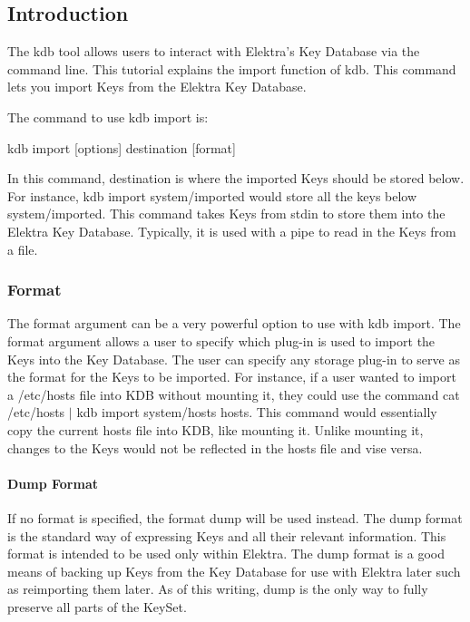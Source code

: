 \subsection*{Introduction}

The kdb tool allows users to interact with Elektra's Key Database via the command line. This tutorial explains the import function of kdb. This command lets you import Keys from the Elektra Key Database.

The command to use kdb import is\+: \begin{DoxyVerb}kdb import [options] destination [format]
\end{DoxyVerb}


In this command, destination is where the imported Keys should be stored below. For instance, {\ttfamily kdb import system/imported} would store all the keys below system/imported. This command takes Keys from stdin to store them into the Elektra Key Database. Typically, it is used with a pipe to read in the Keys from a file.

\subsubsection*{Format}

The format argument can be a very powerful option to use with kdb import. The format argument allows a user to specify which plug-\/in is used to import the Keys into the Key Database. The user can specify any storage plug-\/in to serve as the format for the Keys to be imported. For instance, if a user wanted to import a /etc/hosts file into K\+D\+B without mounting it, they could use the command {\ttfamily cat /etc/hosts $\vert$ kdb import system/hosts hosts}. This command would essentially copy the current hosts file into K\+D\+B, like mounting it. Unlike mounting it, changes to the Keys would not be reflected in the hosts file and vise versa.

\paragraph*{Dump Format}

If no format is specified, the format {\ttfamily dump} will be used instead. The dump format is the standard way of expressing Keys and all their relevant information. This format is intended to be used only within Elektra. The dump format is a good means of backing up Keys from the Key Database for use with Elektra later such as reimporting them later. As of this writing, dump is the only way to fully preserve all parts of the Key\+Set.

